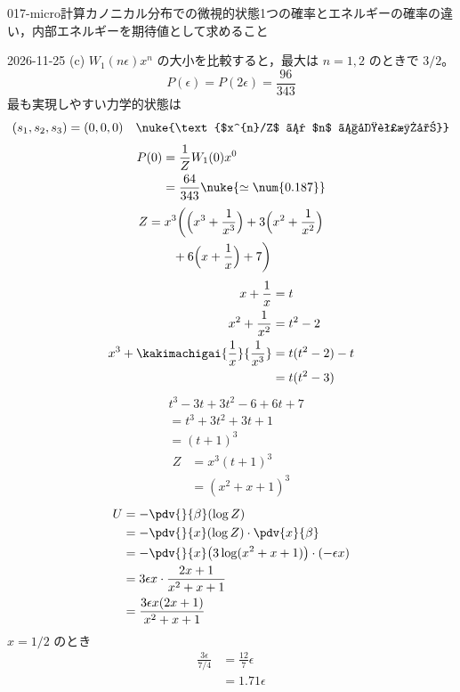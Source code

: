 \documentclass[uplatex,dvipdfmx,a4paper,11pt]{jsarticle}
\begin{document}
\begin{mondai}{017-micro}{計算}{カノニカル分布での微視的状態1つの確率とエネルギーの確率の違い，内部エネルギーを期待値として求めること}
\begin{kotaeutsushi}{2026-11-25}
(c) $W_{1}(n\epsilon)x^{n}$ の大小を比較すると，最大は $n=1,2$ のときで $3/2$。
\[ P(\epsilon)=P(2\epsilon)=\frac{96}{343} \]
最も実現しやすい力学的状態は
\[ (s_{1},s_{2},s_{3})=(0,0,0)\quad\nuke{\text{$x^{n}/Z$ は $n$ で単調減少}} \]
\begin{align*}
P(0)&=\frac{1}{Z}W_{1}(0)x^{0}\\
&=\frac{64}{343}\nuke{\simeq\num{0.187}}
\end{align*}
\begin{align*}
Z&=x^{3}\biggl(\Bigl(x^{3}+\frac{1}{x^{3}}\Bigr)+3\Bigl(x^{2}+\frac{1}{x^{2}}\Bigr)\\
&\qquad+6\Bigl(x+\frac{1}{x}\Bigr)+7\biggr)
\end{align*}
\begin{align*}
x+\frac{1}{x}&=t\\
x^{2}+\frac{1}{x^{2}}&=t^{2}-2\\
x^{3}+\kakimachigai{\frac{1}{x}}{\frac{1}{x^{3}}}&=t(t^{2}-2)-t\\
&=t(t^{2}-3)
\end{align*}
\begin{align*}
&t^{3}-3t+3t^{2}-6+6t+7\\
&=t^{3}+3t^{2}+3t+1\\
&=(t+1)^{3}
\end{align*}
\begin{align*}
Z&=x^{3}(t+1)^{3}\\
&=(x^{2}+x+1)^{3}
\end{align*}
\begin{align*}
U&=-\pdv{}{\beta}(\log Z)\\
&=-\pdv{}{x}(\log Z)\cdot\pdv{x}{\beta}\\
&=-\pdv{}{x}\bigl(3\log(x^{2}+x+1)\bigr)\cdot(-\epsilon x)\\
&=3\epsilon x\cdot\frac{2x+1}{x^{2}+x+1}\\
&=\frac{3\epsilon x(2x+1)}{x^{2}+x+1}
\end{align*}
$x=1/2$ のとき
\begin{align*}
\frac{3\epsilon}{7/4}&=\frac{12}{7}\epsilon\\
&=1.71\epsilon
\end{align*}

\end{kotaeutsushi}
\end{mondai}
\end{document}
